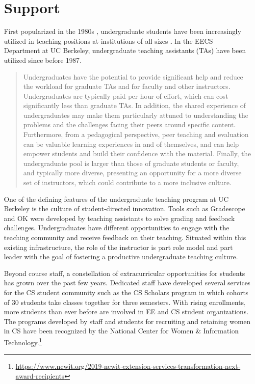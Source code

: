 \chapter{Support}
\label{chapter:support}

First popularized in the 1980s \cite{Reges:1988}, undergraduate students have been increasingly utilized in teaching positions at institutions of all sizes \cite{Roberts:1995, Reges:2003, Decker:2006, Dickson:2017, RetentionCS, Pon-Barry:2019}. In the EECS Department at UC Berkeley, undergraduate teaching assistants (TAs) have been utilized since before 1987.
\begin{quote}
    Undergraduates have the potential to provide significant help and reduce the workload for graduate TAs and for faculty and other instructors. Undergraduates are typically paid per hour of effort, which can cost significantly less than graduate TAs. In addition, the shared experience of undergraduates may make them particularly attuned to understanding the problems and the challenges facing their peers around specific content. Furthermore, from a pedagogical perspective, peer teaching and evaluation can be valuable learning experiences in and of themselves, and can help empower students and build their confidence with the material. Finally, the undergraduate pool is larger than those of graduate students or faculty, and typically more diverse, presenting an opportunity for a more diverse set of instructors, which could contribute to a more inclusive culture. \cite{CSUndergraduateEnrollments}
\end{quote}

One of the defining features of the undergraduate teaching program at UC Berkeley is the culture of student-directed innovation. Tools such as Gradescope and OK were developed by teaching assistants to solve grading and feedback challenges. Undergraduates have different opportunities to engage with the teaching community and receive feedback on their teaching. Situated within this existing infrastructure, the role of the instructor is part role model and part leader with the goal of fostering a productive undergraduate teaching culture.

Beyond course staff, a constellation of extracurricular opportunities for students has grown over the past few years. Dedicated staff have developed several services for the CS student community such as the CS Scholars program in which cohorts of 30 students take classes together for three semesters. With rising enrollments, more students than ever before are involved in EE and CS student organizations. The programs developed by staff and students for recruiting and retaining women in CS have been recognized by the National Center for Women \& Information Technology.\footnote{\url{https://www.ncwit.org/2019-ncwit-extension-services-transformation-next-award-recipients}}

